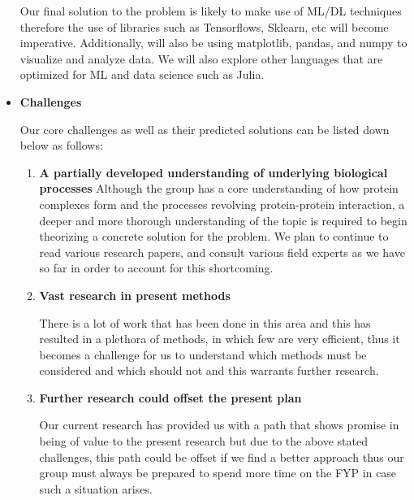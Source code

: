 \documentclass[11pt]{article}
\begin{document}
\begin{itemize}
    Our final solution to the problem is likely to make use of ML/DL techniques therefore the use of libraries such 
    as Tensorflows, Sklearn, etc will become imperative. Additionally,  will also be using matplotlib, pandas, and numpy to visualize and 
    analyze data. We will also explore other languages that are optimized for ML and data science such as Julia.
    \item \textbf{Challenges}
    
    Our core challenges as well as their predicted solutions can be listed down below as follows:
    \begin{enumerate}
        \item \textbf{A partially developed understanding of underlying biological processes}\vspace{0.25em} 
        Although the group has a core understanding of how protein complexes form and the processes revolving protein-protein interaction, a deeper and more thorough understanding of the topic is required to begin theorizing a concrete solution for the problem. We plan to continue to read various research papers, and consult various field experts as we have so far in order to account for this shortcoming.
        
        \item \textbf{Vast research in present methods} \vspace{0.25em}
        
        There is a lot of work that has been done in this area and this has resulted in a plethora of methods, in which few are very efficient, thus it becomes a challenge for us to understand which methods must be considered and which should not and this warrants further research. 
        
        \item \textbf{Further research could offset the present plan} \vspace{0.25em}
        
        Our current research has provided us with a path that shows promise in being of value to the present research but due to the above stated challenges, this path could be offset if we find a better approach thus our group must always be prepared to spend more time on the FYP in case such a situation arises. 
        
    \end{enumerate}
\end{itemize}
\end{document}
